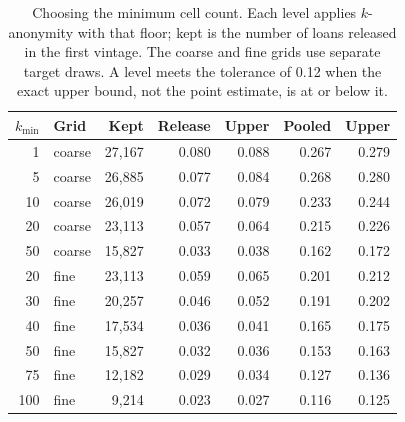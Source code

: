 \begin{table}[t]
\centering
\caption{Choosing the minimum cell count. Each level applies $k$-anonymity with that floor; kept is the number of loans released in the first vintage. The coarse and fine grids use separate target draws. A level meets the tolerance of 0.12 when the exact upper bound, not the point estimate, is at or below it.}
\label{tab:kchoice}
\small
\begin{tabular}{rlrrrrr}
\toprule
$k_{\min}$ & Grid & Kept & Release & Upper & Pooled & Upper \\
\midrule
1 & coarse & 27{,}167 & 0.080 & 0.088 & 0.267 & 0.279 \\
5 & coarse & 26{,}885 & 0.077 & 0.084 & 0.268 & 0.280 \\
10 & coarse & 26{,}019 & 0.072 & 0.079 & 0.233 & 0.244 \\
20 & coarse & 23{,}113 & 0.057 & 0.064 & 0.215 & 0.226 \\
50 & coarse & 15{,}827 & 0.033 & 0.038 & 0.162 & 0.172 \\
20 & fine & 23{,}113 & 0.059 & 0.065 & 0.201 & 0.212 \\
30 & fine & 20{,}257 & 0.046 & 0.052 & 0.191 & 0.202 \\
40 & fine & 17{,}534 & 0.036 & 0.041 & 0.165 & 0.175 \\
50 & fine & 15{,}827 & 0.032 & 0.036 & 0.153 & 0.163 \\
75 & fine & 12{,}182 & 0.029 & 0.034 & 0.127 & 0.136 \\
100 & fine & 9{,}214 & 0.023 & 0.027 & 0.116 & 0.125 \\
\bottomrule
\end{tabular}
\end{table}

